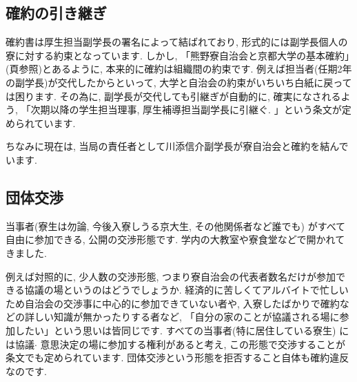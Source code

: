 \documentclass[10pt,b5jsbook,dvips,dvipdfmx,openany]{jsbook}
\theoremstyle{definition}
\begin{document}
		\subsection{確約の引き継ぎ}
		確約書は厚生担当副学長の署名によって結ばれており, 形式的には副学長個人の寮に対する約束となっています. しかし, 「熊野寮自治会と京都大学の基本確約」(\pageref{page:確約}頁参照)とあるように, 本来的に確約は組織間の約束です. 例えば担当者(任期2年の副学長)が交代したからといって, 大学と自治会の約束がいちいち白紙に戻っては困ります. その為に, 副学長が交代しても引継ぎが自動的に, 確実になされるよう, 「次期以降の学生担当理事, 厚生補導担当副学長に引継ぐ. 」という条文が定められています.

		ちなみに現在は, 当局の責任者として川添信介副学長が寮自治会と確約を結んでいます.

		\subsection{団体交渉}
		当事者(寮生は勿論, 今後入寮しうる京大生, その他関係者など誰でも) がすべて自由に参加できる, 公開の交渉形態です. 学内の大教室や寮食堂などで開かれてきました.

		例えば対照的に, 少人数の交渉形態, つまり寮自治会の代表者数名だけが参加できる協議の場というのはどうでしょうか. 経済的に苦しくてアルバイトで忙しいため自治会の交渉事に中心的に参加できていない者や, 入寮したばかりで確約などの詳しい知識が無かったりする者など, 「自分の家のことが協議される場に参加したい」という思いは皆同じです. すべての当事者(特に居住している寮生) には協議$ \cdot $ 意思決定の場に参加する権利があると考え, この形態で交渉することが条文でも定められています. 団体交渉という形態を拒否すること自体も確約違反なのです.

		\label{page:確約}
\end{document}
